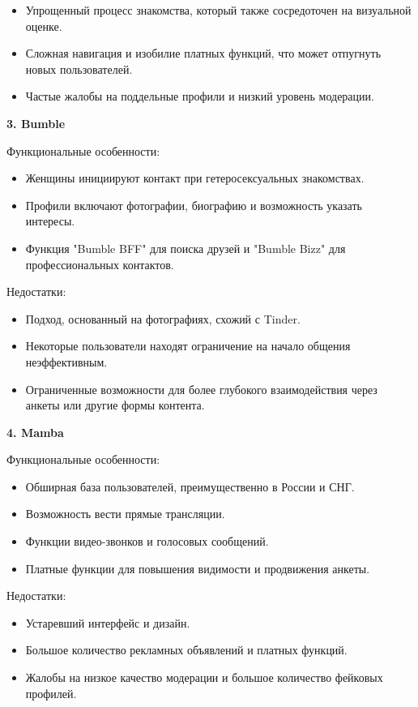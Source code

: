 \begin{itemize}
    \item Упрощенный процесс знакомства, который также сосредоточен на визуальной оценке.
    \item Сложная навигация и изобилие платных функций, что может отпугнуть новых пользователей.
    \item Частые жалобы на поддельные профили и низкий уровень модерации.
\end{itemize}

\textbf{3. Bumble}

Функциональные особенности:

\begin{itemize}
    \item Женщины инициируют контакт при гетеросексуальных знакомствах.
    \item Профили включают фотографии, биографию и возможность указать интересы.
    \item Функция "Bumble BFF" для поиска друзей и "Bumble Bizz" для профессиональных контактов.
\end{itemize}

Недостатки:

\begin{itemize}
    \item Подход, основанный на фотографиях, схожий с Tinder.
    \item Некоторые пользователи находят ограничение на начало общения неэффективным.
    \item Ограниченные возможности для более глубокого взаимодействия через анкеты или другие формы контента.
\end{itemize}

\textbf{4. Mamba}

Функциональные особенности:

\begin{itemize}
    \item Обширная база пользователей, преимущественно в России и СНГ.
    \item Возможность вести прямые трансляции.
    \item Функции видео-звонков и голосовых сообщений.
    \item Платные функции для повышения видимости и продвижения анкеты.
\end{itemize}

Недостатки:

\begin{itemize}
    \item Устаревший интерфейс и дизайн.
    \item Большое количество рекламных объявлений и платных функций.
    \item Жалобы на низкое качество модерации и большое количество фейковых профилей.
\end{itemize}

